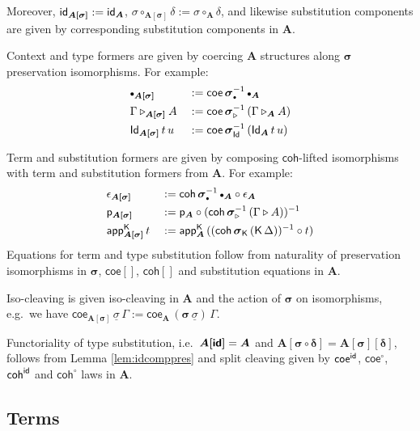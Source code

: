 \documentclass[sigplan,review,anonymous]{acmart}\settopmatter{printfolios=true,printccs=false,printacmref=false}
\newcommand{\ext}{\triangleright}
\newcommand{\emptycon}{\scaleobj{.75}\bullet}
\newcommand{\p}{\mathsf{p}}
\newcommand{\appK}{\mathsf{app}^{\K}}
\newcommand{\bsigma}{\boldsymbol{\sigma}}
\newcommand{\bA}{\boldsymbol{A}}
\newcommand{\ul}[1]{\underline{#1}}
\newcommand{\ulsigma}{\ul{\sigma}}
\newcommand{\coe}{\mathsf{coe}}
\newcommand{\coh}{\mathsf{coh}}
\begin{document}
Moreover, $\id_{\boldsymbol{A[\sigma]}} := \id_{\bA}$,
$\sigma\circ_{\boldsymbol{A[\sigma]}}\delta := \sigma\circ_{\bA}\delta$,
and likewise substitution components are given by corresponding substitution
components in $\bA$.

Context and type formers are given by coercing $\bA$
structures along $\bsigma$ preservation isomorphisms. For example:
\begin{alignat*}{3}
  &\emptycon_{\boldsymbol{A[\sigma]}} && :=
    \coe\,\bsigma_{\emptycon}^{-1}\,\emptycon_{\bA}\\
  &\Gamma\ext_{\boldsymbol{A[\sigma]}}A && :=
    \coe\,\bsigma_{\ext}^{-1}\,(\Gamma\ext_{\bA} A)\\
  &\Id_{\boldsymbol{A[\sigma]}}\,t\,u && :=
    \coe\,\bsigma_{\Id}^{-1}\,(\Id_{\bA}\,t\,u)
\end{alignat*}

Term and substitution formers are given by composing $\coh$-lifted
isomorphisms with term and substitution formers from $\bA$. For example:
\begin{alignat*}{3}
  & \epsilon_{\boldsymbol{A[\sigma]}} && :=
    \coh\,\bsigma_{\emptycon}^{-1}\,\emptycon_{\bA} \circ \epsilon_{\bA}\\
  & \p_{\boldsymbol{A[\sigma]}} && :=
    \p_{\bA} \circ (\coh\,\bsigma_{\ext}^{-1}\,(\Gamma\ext A))^{-1}\\
  & \appK_{\boldsymbol{A[\sigma]}}\,t && :=
    \appK_{\bA}\,((\coh\,\bsigma_{\K}\,(\K\,\Delta))^{-1}\circ t)
\end{alignat*}
Equations for term and type substitution follow from naturality of preservation
isomorphisms in $\bsigma$, $\coe[]$, $\coh[]$ and substitution equations in
$\bA$.

Iso-cleaving is given iso-cleaving in $\bA$ and the action of $\bsigma$ on
isomorphisms, e.g.\ we have $\coe_{\boldsymbol{A[\sigma]}}\,\ulsigma\,\Gamma
:= \coe_{\bA}\,(\bsigma\,\ulsigma)\,\Gamma$.

Functoriality of type substitution, i.e.\ $\boldsymbol{A[\id]} = \bA$ and
$\boldsymbol{A[\sigma\circ\delta]} = \boldsymbol{A[\sigma][\delta]}$, follows
from Lemma \ref{lem:idcomppres} and split cleaving given by $\coe^{\id}$,
$\coe^{\circ}$, $\coh^{\id}$ and $\coh^{\circ}$ laws in $\bA$.

\subsection{Terms}
\end{document}
